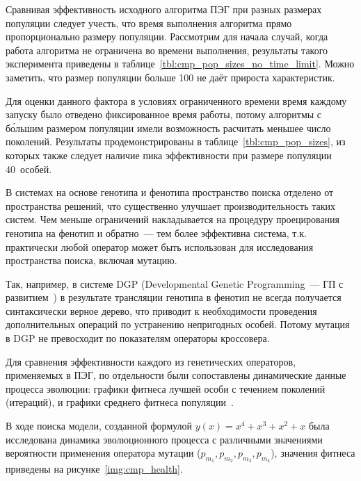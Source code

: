 Сравнивая эффективность исходного алгоритма ПЭГ при разных размерах популяции следует учесть, что время выполнения алгоритма прямо пропорционально размеру популяции. Рассмотрим для начала случай, когда работа алгоритма не ограничена во времени выполнения, результаты такого эксперимента приведены в таблице~\ref{tbl:cmp_pop_sizes_no_time_limit}. Можно заметить, что размер популяции больше 100 не даёт прироста характеристик.



Для оценки данного фактора в условиях ограниченного времени время каждому запуску было отведено фиксированное время работы, потому алгоритмы с б\'{о}льшим размером популяции имели возможность расчитать меньшее число поколений. Результаты продемонстрированы в таблице~\ref{tbl:cmp_pop_sizes}, из которых также следует наличие пика эффективности при размере популяции 40~особей.



В системах на основе генотипа и фенотипа пространство поиска отделено от пространства решений, что существенно улучшает производительность таких систем. Чем меньше ограничений накладывается на процедуру проецирования генотипа на фенотип и обратно~--- тем более эффективна система, т.к. практически любой оператор может быть использован для исследования пространства поиска, включая мутацию.

Так, например, в системе DGP (Developmental Genetic Programming~--- ГП с развитием~\cite{poli2008field}) в результате трансляции генотипа в фенотип не всегда получается синтаксически верное дерево, что приводит к необходимости проведения дополнительных операций по устранению непригодных особей. Потому мутация в DGP не превосходит по показателям операторы кроссовера.

Для сравнения эффективности каждого из генетических операторов, применяемых в ПЭГ, по отдельности были сопоставлены динамические данные процесса эволюции: графики фитнеса лучшей особи с течением поколений (итераций), и графики среднего фитнеса популяции~\cite{ferreira:2002:FEA}.

В ходе поиска модели, созданной формулой $y(x) = x^4 + x^3 + x^2 + x$ была исследована динамика эволюционного процесса с различными значениями вероятности применения оператора мутации ($p_{m_1}, p_{m_2}, p_{m_3}, p_{m_4}$), значения фитнеса приведены на рисунке~\ref{img:cmp_health}.

